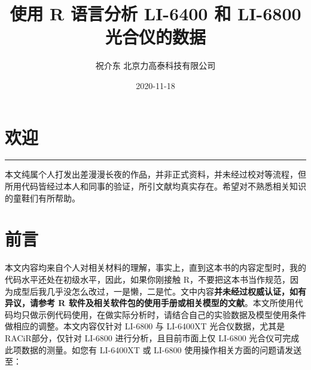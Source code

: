 \documentclass[
]{krantz}
\title{使用 R 语言分析 LI-6400 和 LI-6800 光合仪的数据}
\author{祝介东 北京力高泰科技有限公司}
\date{2020-11-18}
\begin{document}
\maketitle





\thispagestyle{empty}

\setlength{\abovedisplayskip}{-5pt}
\setlength{\abovedisplayshortskip}{-5pt}

{
\hypersetup{linkcolor=}
\setcounter{tocdepth}{2}
\tableofcontents
}
\listoftables
\listoffigures
\hypertarget{welcome}{%
\chapter*{欢迎}\label{welcome}}


\begin{center}\rule{0.5\linewidth}{0.5pt}\end{center}

本文纯属个人打发出差漫漫长夜的作品，并非正式资料，并未经过校对等流程，但所用代码皆经过本人和同事的验证，所引文献均真实存在。希望对不熟悉相关知识的童鞋们有所帮助。

\frontmatter

\hypertarget{frontmatter}{%
\chapter*{前言}\label{frontmatter}}


本文内容均来自个人对相关材料的理解，事实上，直到这本书的内容定型时，我的代码水平还处在初级水平，因此，如果你刚接触 R，不要把这本书当作规范，因为成型后我几乎没怎么改过，一是懒，二是忙。文中内容\textbf{并未经过权威认证，如有异议，请参考 R 软件及相关软件包的使用手册或相关模型的文献}。本文所使用代码均只做示例代码使用，在做实际分析时，请结合自己的实验数据及模型使用条件做相应的调整。本文内容仅针对
LI-6800 与 LI-6400XT 光合仪数据，尤其是 RACiR\texttrademark 部分，仅针对 LI-6800
进行分析，且目前市面上仅 LI-6800 光合仪可完成此项数据的测量。如您有 LI-6400XT 或 LI-6800 使用操作相关方面的问题请发送至：
\end{document}
